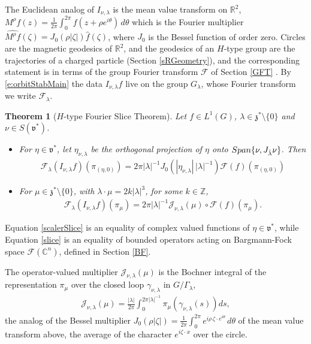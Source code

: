 \documentclass[11pt]{amsart}
\theoremstyle{plain}
\newtheorem{theorem}{Theorem}[section]
\theoremstyle{definition}
\theoremstyle{remark}
\numberwithin{equation}{section}
\def\fz{\mathfrak{z}}
\def\fv{\mathfrak{v}}
\def\cJ{\mathcal{J}}
\def\cF{\mathcal{F}}
\def\mz{\setminus\{0\}}
\def\R{{\mathbb R}}%
\def\C{{\mathbb C}}%
\numberwithin{equation}{section}
\begin{document}
The Euclidean analog of $I_{\nu, \lambda}$ is the mean value transform on $\R^2$,
	$M^\rho f(z)=\frac{1}{2\pi}\int_0^{2\pi} f(z+\rho e^{i\theta})\,d\theta$ which is the Fourier multiplier $\widehat{M^\rho f}(\zeta)= J_0(\rho|\zeta|)\hat{f}(\zeta)$, where $J_0$ is the Bessel function of order zero. Circles are the magnetic geodesics of $\R^2$, and the geodesics of an $H$-type group are the trajectories of a charged particle (Section \ref{sRGeometry}), and the corresponding statement is in terms of the group Fourier transform $\cF$ of Section \ref{GFT} \cite{bahouriFrequencySpaceHeisenberg2019, fischerQuantizationNilpotentLie2016}. By \eqref{e:orbitStabMain} the data $I_{\nu, \lambda}f$ live on the group $G_\lambda$, whose Fourier transform we write $\cF_\lambda$.
\begin{theorem}[$H$-type Fourier Slice Theorem]\label{FourierSliceTheorem}
	Let $f\in L^1(G)$, $\lambda \in \fz^*\setminus\{0\}$ and $\nu\in S(\fv^*)$.
	\begin{itemize}
		\item[1.] For $\eta\in \fv^*$, let $\eta_{\nu, \lambda}$ be the orthogonal projection of $\eta$ onto ${\rm Span}\{\nu, J_{\hat\lambda}\nu\}$. Then
		\begin{align}\label{scalerSlice}
			\cF_\lambda(I_{\nu, \lambda}f)(\pi_{(\eta, 0)})=2\pi|\lambda|^{-1}J_0(|\eta_{\nu, \lambda}|\,|\lambda|^{-1})\cF(f)(\pi_{(\eta, 0)})
		\end{align}
		\item[2.]  For $\mu\in \fz^*\mz$, with $\lambda\cdot \mu=2k|\lambda|^3$, for some $k\in \mathbb{Z}$, 
		\begin{align}
			\mathcal{F}_\lambda\left(I_{\nu, \lambda} f\right)(\pi_\mu)=2\pi|\lambda|^{-1}\mathcal{J}_{\nu, \lambda}( \mu)\circ\mathcal{F}(f)(\pi_\mu). \label{slice}
		\end{align}
	\end{itemize} 
\end{theorem}


Equation \eqref{scalerSlice} is an equality of complex valued functions of $\eta\in \fv^*$, while Equation \eqref{slice} is an equality of bounded operators acting on Bargmann-Fock space $\cF(\C^n)$, defined in Section \ref{BF}.  

The operator-valued multiplier $\cJ_{\nu, \lambda}(\mu)$ is the Bochner integral of the representation $\pi_\mu$ over the closed loop $\gamma_{\nu, \lambda}$ in $G/\Gamma_\lambda$,
\begin{align*}
	\cJ_{\nu, \lambda}(\mu)=\frac{|\lambda|}{2\pi}\int_0^{2\pi|\lambda|^{-1}}\pi_\mu(\gamma_{\nu, \lambda}(s))ds,
\end{align*}
the analog of the Bessel multiplier $J_0(\rho|\zeta|)=\frac{1}{2\pi}\int_0^{2\pi}e^{i\rho\,\zeta\cdot e^{i\theta}}\,d\theta$ of the mean value transform above, the average of the character $e^{i\zeta\cdot x}$ over the circle.
\end{document}
